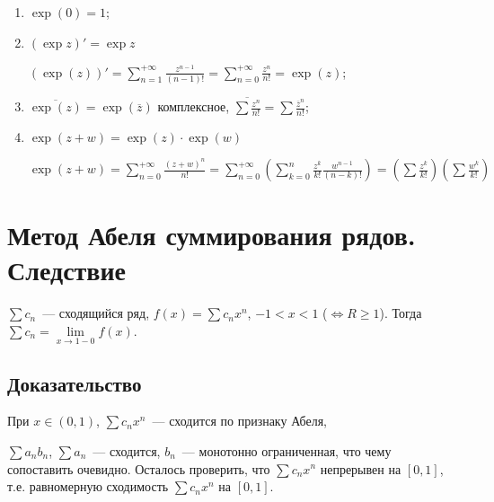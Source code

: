\documentclass{article}
\begin{document}
        \begin{enumerate}
        
            \item $\exp(0) = 1$;
            
            \item $(\exp z)' = \exp z$
            
                $(\exp(z))' = \sum\limits^{+\infty}_{n = 1} \frac{z^{n - 1}}{(n - 1)!} = \sum\limits^{+\infty}_{n = 0} \frac{z^n}{n!} = \exp(z)$;
                
            \item $\overline{\exp(z)} = \exp(\overline{z})$ комплексное, $\overline{\sum \frac{z^n}{n!}} = \sum \frac{\overline{z}^n}{n!}$;
            
            \item $\exp (z + w) = \exp(z) \cdot \exp(w)$
            
                $\exp (z + w) = \sum\limits^{+\infty}_{n = 0} \frac{(z + w)^n}{n!} = \sum\limits^{+\infty}_{n = 0} \left( \sum\limits^n_{k = 0} \frac{z^k}{k!} \frac{w^{n - 1}}{(n - k)!} \right) = \left( \sum \frac{z^k}{k!} \right) \left( \sum \frac{w^k}{k!} \right)$
                
        \end{enumerate}
            
    \newpage
    
    \section{Метод Абеля суммирования рядов. Следствие}
    
        $\sum c_n$~--- сходящийся ряд, $f(x) = \sum c_n x^n$, $-1 < x < 1$ ($\Leftrightarrow R \geq 1$). Тогда $\sum c_n = \lim\limits_{x \rightarrow 1 - 0} f(x)$.
            
        \subsection{Доказательство}
        
            При $x \in (0, 1)$, $\sum c_n x^n$~--- сходится по признаку Абеля,
            
            $\sum a_n b_n$, $\sum a_n$~--- сходится, $b_n$~--- монотонно ограниченная, что чему сопоставить очевидно. Осталось проверить, что $\sum c_n x^n$ непрерывен на $[0, 1]$, т.е. равномерную сходимость $\sum c_n x^n$ на $[0, 1]$.
            
\end{document}
